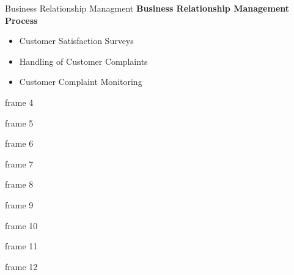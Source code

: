 \documentclass[xcolor=x11names,compress]{beamer}
\renewcommand{\(}{\begin{columns}}
\renewcommand{\)}{\end{columns}}
\newcommand{\<}[1]{\begin{column}{#1}}
\renewcommand{\>}{\end{column}}
\begin{document}
\begin{frame}{Business Relationship Managment}
\textbf{Business Relationship Management Process}
\begin{itemize}
	\item Customer Satisfaction Surveys
	\item Handling of Customer Complaints	
	\item Customer Complaint Monitoring		
\end{itemize}
\end{frame}
\begin{frame}{frame 4}

\end{frame}
\begin{frame}{frame 5}

\end{frame}
\begin{frame}{frame 6}

\end{frame}
\begin{frame}{frame 7}

\end{frame}
\begin{frame}{frame 8}

\end{frame}
\begin{frame}{frame 9}

\end{frame}
\begin{frame}{frame 10}

\end{frame}
\begin{frame}{frame 11}

\end{frame}
\begin{frame}{frame 12}

\end{frame}
\end{document}
